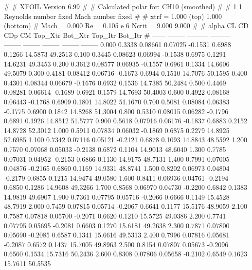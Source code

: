 #  
#       XFOIL         Version 6.99
#  
# Calculated polar for: CH10 (smoothed)                                 
#  
# 1 1 Reynolds number fixed          Mach number fixed         
#  
# xtrf =   1.000 (top)        1.000 (bottom)  
# Mach =   0.000     Re =     0.105 e 6     Ncrit =   9.000  9.000
#  
#   alpha    CL        CD       CDp       CM     Top_Xtr  Bot_Xtr  Top_Itr  Bot_Itr
#  ------ -------- --------- --------- -------- -------- -------- -------- --------
   0.000   0.3338   0.08661   0.07025  -0.1531   0.6988   0.1266  14.5873  49.2513
   0.100   0.3445   0.08623   0.06994  -0.1538   0.6975   0.1291  14.6231  49.3453
   0.200   0.3612   0.08577   0.06935  -0.1557   0.6961   0.1334  14.6606  49.5079
   0.300   0.4181   0.08412   0.06716  -0.1673   0.6944   0.1510  14.7076  50.1595
   0.400   0.4301   0.08344   0.06679  -0.1676   0.6932   0.1536  14.7385  50.2484
   0.500   0.4469   0.08281   0.06614  -0.1689   0.6921   0.1579  14.7693  50.4003
   0.600   0.4922   0.08168   0.06443  -0.1768   0.6909   0.1801  14.8022  51.1670
   0.700   0.5081   0.08084   0.06383  -0.1775   0.6900   0.1842  14.8268  51.3004
   0.800   0.5310   0.08015   0.06282  -0.1796   0.6891   0.1926  14.8512  51.5777
   0.900   0.5618   0.07916   0.06176  -0.1837   0.6883   0.2152  14.8728  52.3012
   1.000   0.5911   0.07834   0.06032  -0.1869   0.6875   0.2279  14.8925  52.6985
   1.100   0.7342   0.07116   0.05121  -0.2121   0.6878   0.1093  14.8843  48.5592
   1.200   0.7570   0.07068   0.05033  -0.2138   0.6872   0.1104  14.9013  48.6040
   1.300   0.7785   0.07031   0.04952  -0.2153   0.6866   0.1130  14.9175  48.7131
   1.400   0.7991   0.07005   0.04876  -0.2165   0.6860   0.1169  14.9331  48.8741
   1.500   0.8202   0.06973   0.04804  -0.2179   0.6855   0.1215  14.9474  49.0580
   1.600   0.8411   0.06936   0.04761  -0.2194   0.6850   0.1286  14.9608  49.3266
   1.700   0.8568   0.06970   0.04730  -0.2200   0.6842   0.1383  14.9819  49.6907
   1.900   0.7361   0.07795   0.05716  -0.2066   0.6666   0.1149  15.4528  48.7919
   2.000   0.7459   0.07815   0.05714  -0.2067   0.6641   0.1177  15.5176  48.9059
   2.100   0.7587   0.07818   0.05700  -0.2071   0.6620   0.1210  15.5725  49.0386
   2.200   0.7741   0.07795   0.05695  -0.2081   0.6603   0.1270  15.6181  49.2638
   2.300   0.7871   0.07800   0.05690  -0.2085   0.6587   0.1341  15.6616  49.5313
   2.400   0.7996   0.07816   0.05681  -0.2087   0.6572   0.1437  15.7005  49.8963
   2.500   0.8154   0.07807   0.05673  -0.2096   0.6560   0.1534  15.7316  50.2436
   2.600   0.8308   0.07806   0.05658  -0.2102   0.6549   0.1623  15.7611  50.5535
